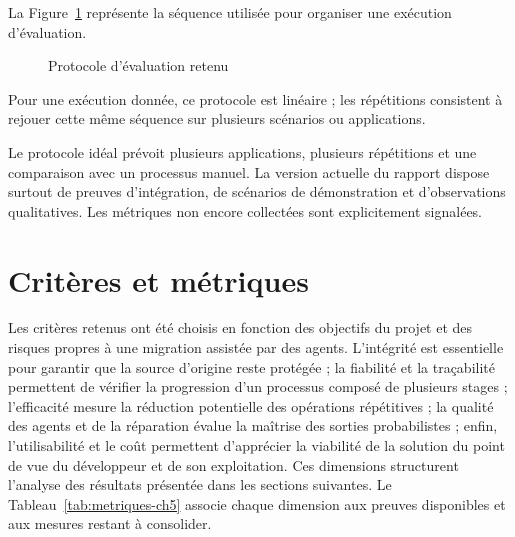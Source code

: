 La Figure~\ref{fig:protocole-evaluation-ch5} représente la séquence utilisée pour organiser une exécution d'évaluation.

\begin{figure}[H]
    \centering
    \caption{Protocole d'évaluation retenu}
    \label{fig:protocole-evaluation-ch5}
\end{figure}

Pour une exécution donnée, ce protocole est linéaire ; les répétitions consistent à rejouer cette même séquence sur plusieurs scénarios ou applications.

Le protocole idéal prévoit plusieurs applications, plusieurs répétitions et une comparaison avec un processus manuel. La version actuelle du rapport dispose surtout de preuves d'intégration, de scénarios de démonstration et d'observations qualitatives. Les métriques non encore collectées sont explicitement signalées.

\section{Critères et métriques}

Les critères retenus ont été choisis en fonction des objectifs du projet et des risques propres à une migration assistée par des agents. L'intégrité est essentielle pour garantir que la source d'origine reste protégée ; la fiabilité et la traçabilité permettent de vérifier la progression d'un processus composé de plusieurs stages ; l'efficacité mesure la réduction potentielle des opérations répétitives ; la qualité des agents et de la réparation évalue la maîtrise des sorties probabilistes ; enfin, l'utilisabilité et le coût permettent d'apprécier la viabilité de la solution du point de vue du développeur et de son exploitation. Ces dimensions structurent l'analyse des résultats présentée dans les sections suivantes. Le Tableau~\ref{tab:metriques-ch5} associe chaque dimension aux preuves disponibles et aux mesures restant à consolider.

